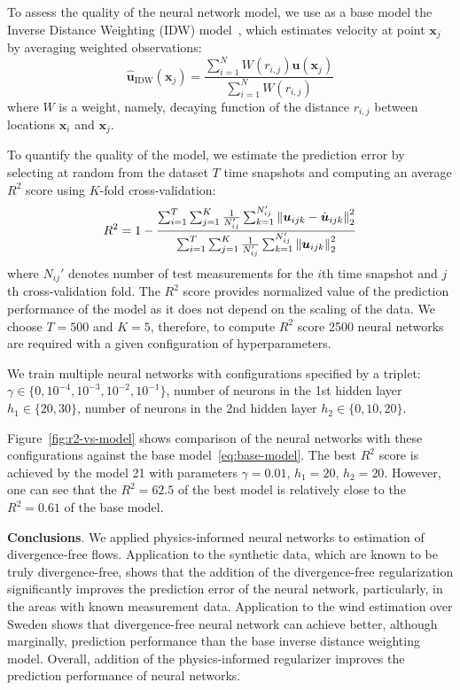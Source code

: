\documentclass[pamm,a4paper,fleqn]{w-art}
\renewcommand{\vec}[1]{\boldsymbol{#1}}
\newcommand{\norm}[1]{\left\lVert#1\right\rVert}
\begin{document}
To assess the quality of the neural network model, we use as a base model the
Inverse Distance Weighting (IDW)
model~\cite{Cellura2008}, which
estimates velocity at point $\vec x_j$ by averaging weighted observations:
\begin{equation}
  \label{eq:base-model}
  \hat{\vec u}_{\text{IDW}}(\vec x_j) =
  \frac{\sum_{i=1}^N W(r_{i,j}) \vec u(\vec x_j)}{\sum_{i=1}^N W(r_{i,j})}
\end{equation}
where $W$ is a weight, namely, decaying function of the distance $r_{i, j}$
between locations $\vec x_i$ and $\vec x_j$.

To quantify the quality of the model, we estimate the prediction error
by selecting at random from the dataset $T$ time snapshots and computing
an average $R^2$ score using $K$-fold cross-validation:
\[
  R^2 = 1 - \frac{%
    \sum_{i=1}^T \sum_{j=1}^K \frac{1}{N_{ij}'}
    \sum_{k=1}^{N_{ij}'} \norm{\vec{u}_{ijk} - \hat{\vec{u}}_{ijk}}^2_2}
  {%
    \sum_{i=1}^T \sum_{j=1}^K \frac{1}{N_{ij}'}
    \sum_{k=1}^{N_{ij}'} \norm{\vec{u}_{ijk}}^2_2}
\]
where $N_{ij}'$ denotes number of test measurements for the $i$th time snapshot
and $j$th cross-validation fold.
The $R^2$ score provides normalized value of the prediction performance of the
model as it does not depend on the scaling of the data.
We choose $T=500$ and $K=5$, therefore, to compute $R^2$ score 2500 neural
networks are required with a given configuration of hyperparameters.

We train multiple neural networks with configurations specified by a triplet: 
$\gamma \in \{0, 10^{-4}, 10^{-3}, 10^{-2}, 10^{-1}\}$, 
number of neurons in the 1st hidden layer $h_1 \in \{20, 30\}$,
number of neurons in the 2nd hidden layer $h_2 \in \{0, 10, 20\}$.

Figure~\ref{fig:r2-vs-model} shows comparison of the neural networks with these
configurations against the base model~\eqref{eq:base-model}.
The best $R^2$ score is achieved by the model 21 with parameters $\gamma=0.01$,
$h_1=20$, $h_2=20$.
However, one can see that the $R^2=62.5$ of the best model is relatively close
to the $R^2=0.61$ of the base model.

\textbf{Conclusions}.
We applied physics-informed neural networks to estimation of divergence-free
flows.
Application to the synthetic data, which are known to be truly divergence-free,
shows that the addition of the divergence-free regularization significantly
improves the prediction error of the neural network, particularly, in the areas
with known measurement data.
Application to the wind estimation over Sweden shows that divergence-free neural
network can achieve better, although marginally, prediction performance than
the base inverse distance weighting model.
Overall, addition of the physics-informed regularizer improves the prediction
performance of neural networks.
\end{document}
